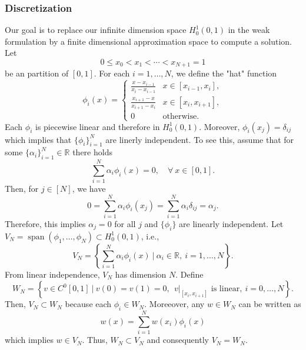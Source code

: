 \documentclass{article}
\theoremstyle{definition}
\theoremstyle{definition}
\newcommand{\R}{\mathbb{R}}
\begin{document}
\subsubsection{Discretization}
Our goal is to replace our infinite dimension space $H^1_0(0,1)$ in the weak formulation by a finite dimensional approximation space to compute a solution. Let
$$0\leq x_0<x_1<\cdots<x_{N+1}=1$$
be an partition of $[0,1]$. For each $i=1,\ldots,N$, we define the "hat" function
$$\phi_i(x)=\begin{cases}
    \frac{x-x_{i-1}}{x_i-x_{i-1}}&x\in [x_{i-1},x_i],\\
    \frac{x_{i+1}-x}{x_{i+1}-x_i}&x\in [x_{i},x_{i+1}],\\
    0&\text{otherwise}.
\end{cases}$$
Each $\phi_i$ is piecewise linear and therefore in $H^1_0(0,1)$. Moreover, $\phi_i(x_j)=\delta_{ij}$ which implies that $\{\phi_i\}_{i=1}^{N}$ are linerly independent. To see this, assume that for some $\{\alpha_i\}_{i=1}^{N}\in \R$ there holds
$$\sum_{i=1}^{N}\alpha_i\phi_i(x)=0,\quad \forall\:x\in [0,1].$$
Then, for $j\in [N]$, we have
$$0=\sum_{i=1}^{N}\alpha_i \phi_i(x_j)=\sum_{i=1}^{N}\alpha_i\delta_{ij}=\alpha_j.$$
Therefore, this implies $\alpha_j=0$ for all $j$ and $\{\phi_i\}$ are linearly independent. Let $V_N=\operatorname{span}(\phi_1,\ldots,\phi_N)\subset H^1_0(0,1)$, i.e.,
$$V_N=\left\{\sum_{i=1}^{N}\alpha_i\phi_i(x)\:|\:\alpha_i\in \R,\:i=1,\ldots,N\right\}.$$
From linear independence, $V_N$ has dimension $N$. Define
$$W_N=\left\{v\in C^0[0,1]\:|\:v(0)=v(1)=0,\:\:v|_{[x_i,x_{i+1}]} \text{ is linear}, \:i=0,\ldots,N\right\}.$$
Then, $V_N\subset W_N$ because each $\phi_i\in W_N$. Moreeover, any $w\in W_N$ can be written as
$$w(x)=\sum_{i=1}^{N}w(x_i)\phi_i(x)$$
which implies $w\in V_N$. Thus, $W_N\subset V_N$ and consequently $V_N=W_N$.
\end{document}
